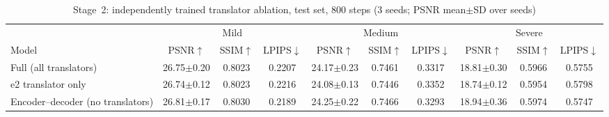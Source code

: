 \begin{table}[t]
\centering
\caption{Stage~2: independently trained translator ablation, test set, 800 steps (3 seeds; PSNR mean$\pm$SD over seeds)}
\label{tab:translators}
\setlength{\tabcolsep}{4pt}
\begin{tabular}{lccccccccc}
\toprule
 & \multicolumn{3}{c}{Mild} & \multicolumn{3}{c}{Medium} & \multicolumn{3}{c}{Severe} \\
\cmidrule(lr){2-4}\cmidrule(lr){5-7}\cmidrule(lr){8-10}
Model & PSNR$\uparrow$ & SSIM$\uparrow$ & LPIPS$\downarrow$ & PSNR$\uparrow$ & SSIM$\uparrow$ & LPIPS$\downarrow$ & PSNR$\uparrow$ & SSIM$\uparrow$ & LPIPS$\downarrow$ \\
\midrule
Full (all translators) & 26.75$\pm$0.20 & 0.8023 & 0.2207 & 24.17$\pm$0.23 & 0.7461 & 0.3317 & 18.81$\pm$0.30 & 0.5966 & 0.5755 \\
e2 translator only & 26.74$\pm$0.12 & 0.8023 & 0.2216 & 24.08$\pm$0.13 & 0.7446 & 0.3352 & 18.74$\pm$0.12 & 0.5954 & 0.5798 \\
Encoder--decoder (no translators) & 26.81$\pm$0.17 & 0.8030 & 0.2189 & 24.25$\pm$0.22 & 0.7466 & 0.3293 & 18.94$\pm$0.36 & 0.5974 & 0.5747 \\
\bottomrule
\end{tabular}
\end{table}
